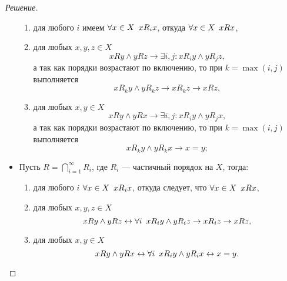 \begin{proof}[Решение]
\begin{itemize}
            \begin{enumerate}[label=\arabic{*})]
                \item для любого \(i\) имеем \(\forall x \in X \enskip x R_i x\), откуда \(\forall x \in X \enskip x R x\),
                \item для любых \(x, y, z \in X\) \[
                    x R y \land y R z \to \exists i, j: x R_i y \land y R_j z,
                \]
                а так как порядки возрастают по включению, то при \(k = \max(i, j)\) выполняется \[
                    x R_k y \land y R_k z \to x R_k z \to x R z,
                \]
                \item для любых \(x, y \in X\) \[
                    x R y \land y R x \to \exists i, j: x R_i y \land y R_j x,
                \]
                а так как порядки возрастают по включению, то при \(k = \max(i, j)\) выполняется \[
                    x R_k y \land y R_k x \to x = y;
                \]
            \end{enumerate}
            \item Пусть \(R = \bigcap_{i=1}^{\infty} R_i\), где \(R_i\) --- частичный порядок на \(X\), тогда:
            \begin{enumerate}[label=\arabic{*})]
                \item для любого \(i\) \(\forall x \in X \enskip x R_i x \), откуда следует, что \(\forall x \in X \enskip x R x \),
                \item для любых \(x, y, z \in X\) \[
                    x R y \land y R z \leftrightarrow \forall i \enskip x R_i y \land y R_i z \to x R_i z \to x R z,
                \]
                \item для любых \(x, y \in X\) \[
                    x R y \land y R x \leftrightarrow \forall i \enskip x R_i y \land y R_i x \leftrightarrow x = y.
                \]
            \end{enumerate}
        \end{itemize}
    \end{proof}

